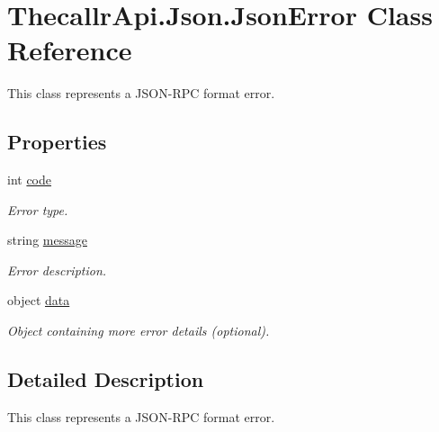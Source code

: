 \hypertarget{class_thecallr_api_1_1_json_1_1_json_error}{\section{Thecallr\+Api.\+Json.\+Json\+Error Class Reference}
\label{class_thecallr_api_1_1_json_1_1_json_error}
}


This class represents a J\+S\+O\+N-\/\+R\+P\+C format error.  


\subsection*{Properties}
\begin{DoxyCompactItemize}
\item 
int \hyperlink{class_thecallr_api_1_1_json_1_1_json_error_afedfded0b702f999b5dbf2765cb296e3}{code}
\begin{DoxyCompactList}\small\item\em Error type. \end{DoxyCompactList}\item 
string \hyperlink{class_thecallr_api_1_1_json_1_1_json_error_adb98db03a6d6c2a5f6d209cfbd38d96f}{message}
\begin{DoxyCompactList}\small\item\em Error description. \end{DoxyCompactList}\item 
object \hyperlink{class_thecallr_api_1_1_json_1_1_json_error_a0817a85286acbf457ae240f0a17a6140}{data}
\begin{DoxyCompactList}\small\item\em Object containing more error details (optional). \end{DoxyCompactList}\end{DoxyCompactItemize}


\subsection{Detailed Description}
This class represents a J\+S\+O\+N-\/\+R\+P\+C format error. 



